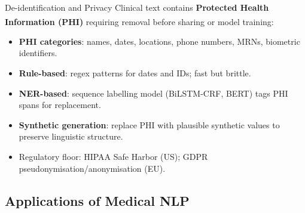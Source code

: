 \begin{v3topic}{De-identification and Privacy}
    Clinical text contains \textbf{Protected Health Information (PHI)} requiring removal before sharing or model training\textsuperscript{\cite[][pp.~45--60]{itgovernanceprivacyteamEUGDPR2020}}:
    \begin{itemize}
        \item \textbf{PHI categories}: names, dates, locations, phone numbers, MRNs, biometric identifiers.
        \item \textbf{Rule-based}: regex patterns for dates and IDs; fast but brittle.
        \item \textbf{NER-based}: sequence labelling model (BiLSTM-CRF, BERT) tags PHI spans for replacement.
        \item \textbf{Synthetic generation}: replace PHI with plausible synthetic values to preserve linguistic structure.
        \item Regulatory floor: HIPAA Safe Harbor (US); GDPR pseudonymisation/anonymisation (EU).
    \end{itemize}
\end{v3topic}

\subsection{Applications of Medical NLP}

